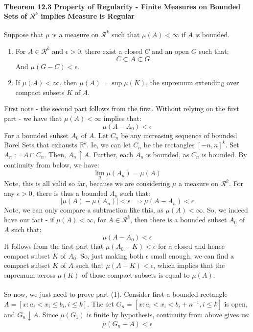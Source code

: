 \documentclass[12pt,a4paper]{article}
\newcommand{\1}[1]{\mathbbm{1}\left\{ #1 \right\}}
\newcommand{\R}{\mathbb{R}}
\newcommand{\rcal}{\mathcal{R}}
\begin{document}
\paragraph{Theorem 12.3 Property of Regularity - Finite Measures on Bounded Sets of $\rcal^k$ implies Measure is Regular} Suppose that $\mu$ is a measure on $\rcal^k$ such that $\mu(A) < \infty$ if $A$ is bounded.
\begin{enumerate}
	\item For $A \in \rcal^k$ and $\epsilon > 0$, there exist a closed $C$ and an open $G$ such that:
	$$
		C \subset A \subset G
	$$
	And $\mu(G - C) < \epsilon$.
	
	\item If $\mu(A) < \infty$, then $\mu(A) = \sup \mu(K)$, the supremum extending over compact subsets $K$ of $A$.
\end{enumerate}
First note - the second part follows from the first. Without relying on the first part - we have that $\mu(A) < \infty$ implies that:
$$
	\mu(A - A_0) < \epsilon
$$
For a bounded subset $A_0$ of $A$. Let $C_n$ be any increasing sequence of bounded Borel Sets that exhausts $\R^k$. Ie, we can let $C_n$ be the rectangles $[-n,n]^k$. Set $A_n := A \cap C_n$. Then, $A_n \uparrow A$. Further, each $A_n$ is bounded, as $C_n$ is bounded. By continuity from below, we have:
$$
	\lim_n \mu(A_n) = \mu(A)
$$
Note, this is all valid so far, because we are considering $\mu$ a measure on $\rcal^k$. For any $\epsilon > 0$, there is thus a bounded $A_n$ such that:
$$
	\left|\mu(A) - \mu(A_n)\right| < \epsilon \implies
	\mu(A - A_n) < \epsilon
$$
Note, we can only compare a subtraction like this, as $\mu(A) < \infty$. So, we indeed have our fact - if $\mu(A) < \infty$, for $A \in \rcal^k$, then there is a bounded subset $A_0$ of $A$ such that:
$$
	\mu\left(A - A_0\right) < \epsilon
$$
It follows from the first part that $\mu(A_0 - K) < \epsilon$ for a closed and hence compact subset $K$ of $A_0$. So, just making both $\epsilon$ small enough, we can find a compact subset $K$ of $A$ such that $\mu\left(A - K\right) < \epsilon$, which implies that the supremum across $\mu(K)$ of those compact subsets is equal to $\mu(A)$.
\\\\
So now, we just need to prove part (1). Consider first a bounded rectangle $A = \left[x : a_i < x_i \leq b_i, i \leq k\right]$. The set $G_n = \left[x : a_i < x_i < b_i + n^{-1}, i \leq k\right]$ is open, and $G_n \downarrow A$. Since $\mu(G_1)$ is finite by hypothesis, continuity from above gives us:
$$
	\mu(G_n - A) < \epsilon
$$
\end{document}
